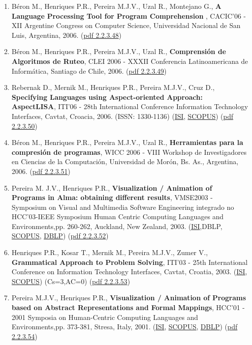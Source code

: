 \documentclass[11pt]{article}
\begin{document}
\begin{enumerate}
\item {Béron M., Henriques P.R., Pereira M.J.V., Uzal R., Montejano G., {\bf{ A Language Processing Tool for Program Comprehension}} , CACIC'06 - XII Argentine Congress on Computer Science, Universidad Nacional de San Luis, Argentina, 2006. (\href{run:Publicacoes/publicacoes/15.pdf}{pdf 2.2.3.48})}
\item {Béron M., Henriques P.R., Pereira M.J.V., Uzal R., {\bf{ Comprensión de Algoritmos de Ruteo}}, CLEI 2006 - XXXII Conferencia Latinoamericana de Informática, Santiago de Chile, 2006. (\href{run:Publicacoes/publicacoes/18.pdf}{pdf 2.2.3.49})}
\item {Rebernak D., Mernik M., Henriques P.R., Pereira M.J.V., Cruz D., {\bf{ Specifying Languages using Aspect-oriented Approach: AspectLISA}}, ITI'06 - 28th International Conference Information Technology Interfaces, Cavtat, Croacia, 2006. (ISSN: 1330-1136) (\href{run:Publicacoes/ComprovativosISI.pdf}{ISI}, \href{run:Publicacoes/PublicacoesSCOPUS.pdf}{SCOPUS}) (\href{run:Publicacoes/publicacoes/19.pdf}{pdf 2.2.3.50})}
\item {Béron M., Henriques P.R., Pereira M.J.V., Uzal R., {\bf{ Herramientas para la compresión de programas}}, WICC 2006 - VIII Workshop de Investigadores en Ciencias de la Computación, Universidad de Morón, Bs. As., Argentina, 2006. (\href{run:Publicacoes/publicacoes/17.pdf}{pdf 2.2.3.51})}
\item {Pereira M. J.V., Henriques P.R., {\bf{ Visualization / Animation of Programs in Alma: obtaining different results}}, VMSE2003 - Symposium on Visual and Multimedia Software Engineering integrado no HCC'03-IEEE Symposium Human Centric Computing Languages and Environments,pp. 260-262, Auckland, New Zealand, 2003. (\href{run:Publicacoes/ComprovativosISI.pdf}{ISI},DBLP, \href{run:Publicacoes/PublicacoesSCOPUS.pdf}{SCOPUS}, \href{run:Publicacoes/ComprovativosDBLP.pdf}{DBLP}) (\href{run:Publicacoes/publicacoes/9.pdf}{pdf 2.2.3.52})}
\item {Henriques P.R., Kosar T., Mernik M., Pereira M.J.V., Zumer V., {\bf{ Grammatical Approach to Problem Solving}}, ITI'03 - 25th International Conference on Information Technology Interfaces, Cavtat, Croatia, 2003. (\href{run:Publicacoes/ComprovativosISI.pdf}{ISI}, \href{run:Publicacoes/PublicacoesSCOPUS.pdf}{SCOPUS}) (Cs=3,AC=0) (\href{run:Publicacoes/publicacoes/7.pdf}{pdf 2.2.3.53})}
\item {Pereira M.J.V., Henriques P.R., {\bf{ Visualization / Animation of Programs based on Abstract Representations and Formal Mappings}}, HCC'01 - 2001 Symposia on Human-Centric Computing Languages and Environments,pp. 373-381, Stresa, Italy, 2001. (\href{run:Publicacoes/ComprovativosISI.pdf}{ISI}, \href{run:Publicacoes/PublicacoesSCOPUS.pdf}{SCOPUS}, \href{run:Publicacoes/ComprovativosDBLP.pdf}{DBLP}) (\href{run:Publicacoes/publicacoes/5.pdf}{pdf 2.2.3.54})}

\end{enumerate}
\end{document}

